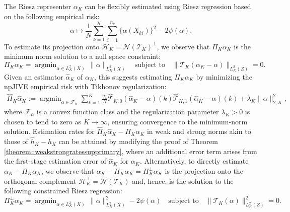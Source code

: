 \documentclass[11pt]{article}
\theoremstyle{plain}
\theoremstyle{definition}
\theoremstyle{remark}
\theoremstyle{definition}
\DeclareMathOperator*{\argmin}{argmin}
\begin{document}
The Riesz representer $\alpha_K$ can be flexibly estimated using Riesz regression \citep{chernozhukov2022automatic} based on the following empirical risk:
 $$\alpha \mapsto \frac{1}{N}\sum_{k=1}^K \sum_{i=1}^{n_k} \{\alpha(X_{ki})\}^2 - 2\psi(\alpha).$$
To estimate its projection onto $\mathcal{H}_K = \mathcal{N}(\mathcal{T}_K)^{\perp}$, we observe that $\Pi_K \alpha_K$ is the minimum norm solution to a null space constraint:
$$\Pi_K \alpha_K = \argmin_{\alpha \in  L^2_K(X)}\, \|\alpha\|_{L^2_K(X)} \quad \text{subject to} \quad \|\mathcal{T}_K(\alpha_K - \alpha)\|_{L^2_K(Z)} = 0.$$
Given an estimator $\widehat{\alpha}_K$ of $\alpha_K$, this suggests estimating $\Pi_K \alpha_K$ by minimizing the npJIVE empirical risk with Tikhonov regularization:
 \begin{align*}
  \widehat{\Pi}_K\widehat{\alpha}_K := \argmin_{\alpha \in \mathcal{F}_{\alpha}} \sum_{k=1}^K \frac{n_k}{N} \widehat{\mathcal{T}}_{K,0}(\widehat{\alpha}_K - \alpha)(k)\widehat{\mathcal{T}}_{K,1}(\widehat{\alpha}_K - \alpha)(k) + \lambda_K \|\alpha\|_{2, K}^2,
 \end{align*}
 where $\mathcal{F}_{\alpha}$ is a convex function class and the regularization parameter \( \lambda_K > 0 \) is chosen to tend to zero as \( K \to \infty \), ensuring convergence to the minimum-norm solution. Estimation rates for $ \widehat{\Pi}_K\widehat{\alpha}_K - \Pi_K \alpha_K$ in weak and strong norms akin to those of $\widehat{h}_K - h_K$ can be attained by modifying the proof of Theorem \ref{theorem::weakstrongratessupprimary}, where an additional error term arises from the first-stage estimation error of $\widehat{\alpha}_K$ for $\alpha_K$.  Alternatively, to directly estimate $\alpha_K - \Pi_K \alpha_K$, we observe that $\alpha_K - \Pi_K \alpha_K = \Pi_K^\perp \alpha_K$ is the projection onto the orthogonal complement $\mathcal{H}_K^\perp = \mathcal{N}(\mathcal{T}_K)$ and, hence, is the solution to the following constrained Riesz regression:
$$\Pi_K^\perp \alpha_K = \argmin_{\alpha \in  L^2_K(X)}\, \|\alpha\|_{L^2_K(X)}^2 - 2\psi(\alpha)\quad \text{subject to} \quad \|\mathcal{T}_K(\alpha)\|_{L^2_K(Z)}^2 = 0.$$
 
 
  
\end{document}
